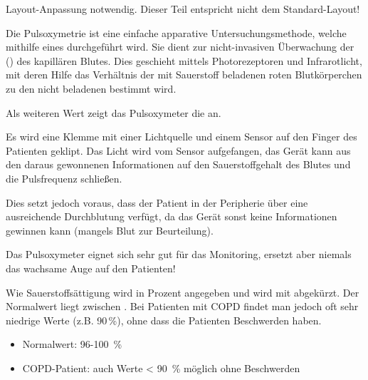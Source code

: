 \begin{anfxwarning}[author=GABS]{Layout-Anpassung notwendig.}
   Dieser Teil entspricht nicht dem Standard-Layout!
\end{anfxwarning}
\MarriedNG{\TxBeschreibung}
{
Die Pulsoxymetrie ist eine einfache apparative
Untersuchungsmethode, welche mithilfe eines
 durchgeführt wird. 
Sie dient zur nicht-invasiven Überwachung der
 () des kapillären
Blutes. Dies geschieht mittels Photorezeptoren und
Infrarotlicht, mit deren Hilfe das Verhältnis der mit
Sauerstoff beladenen roten Blutkörperchen zu den nicht
beladenen bestimmt wird. 

Als weiteren Wert zeigt das Pulsoxymeter die
 an.
\cite{LoefflerBiochemie7,ArbeitstechnikenAZ1,Soehnke200607}

}{
{\SymbolText}
}

{
Es wird eine Klemme mit einer Lichtquelle
und einem Sensor auf den Finger des Patienten
geklipt. Das Licht wird vom
 Sensor aufgefangen, das Gerät kann aus den daraus gewonnenen Informationen auf den Sauerstoffgehalt des Blutes und die Pulsfrequenz schließen. 

Dies setzt jedoch
voraus, dass der Patient in der Peripherie über eine
ausreichende Durchblutung verfügt, da das Gerät sonst keine
Informationen gewinnen kann (mangels Blut zur
Beurteilung). 
}{}{}{}{}



Das Pulsoxymeter eignet sich sehr gut für das Monitoring,
ersetzt aber niemals das wachsame Auge auf den Patienten!

{
Wie Sauerstoffsättigung wird in Prozent
angegeben und wird mit  abgekürzt. Der Normalwert
liegt zwischen . Bei Patienten mit COPD
findet man jedoch oft sehr niedrige Werte (z.B.
90\,\%), ohne dass die Patienten Beschwerden haben. }{
\begin{itemize}
  \item Normalwert: 96-100\, \%
  \item COPD-Patient: auch Werte < 90\, \% möglich ohne
  Beschwerden
\end{itemize}
}{}{}{}


